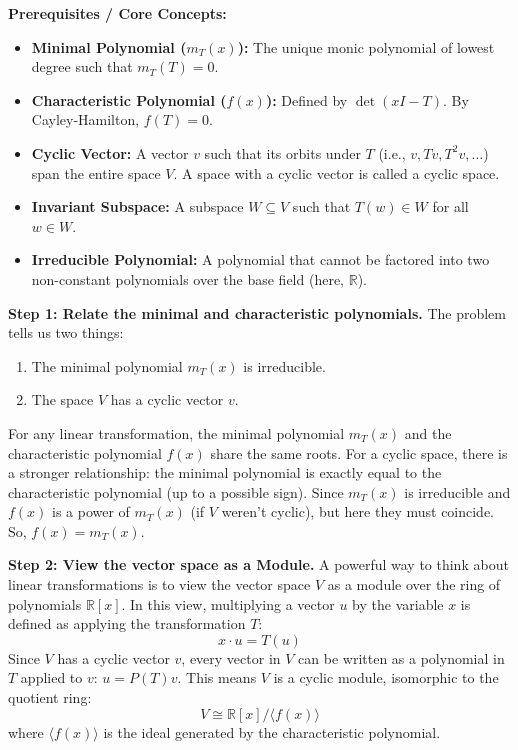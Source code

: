 \begin{solution}
\textbf{Prerequisites / Core Concepts:}
\begin{itemize}
    \item \textbf{Minimal Polynomial ($m_T(x)$):} The unique monic polynomial of lowest degree such that $m_T(T) = 0$.
    \item \textbf{Characteristic Polynomial ($f(x)$):} Defined by $\det(xI - T)$. By Cayley-Hamilton, $f(T) = 0$.
    \item \textbf{Cyclic Vector:} A vector $v$ such that its orbits under $T$ (i.e., $v, Tv, T^2v, \dots$) span the entire space $V$. A space with a cyclic vector is called a cyclic space.
    \item \textbf{Invariant Subspace:} A subspace $W \subseteq V$ such that $T(w) \in W$ for all $w \in W$.
    \item \textbf{Irreducible Polynomial:} A polynomial that cannot be factored into two non-constant polynomials over the base field (here, $\mathbb{R}$).
\end{itemize}

\textbf{Step 1: Relate the minimal and characteristic polynomials.}
The problem tells us two things:
\begin{enumerate}
    \item The minimal polynomial $m_T(x)$ is irreducible.
    \item The space $V$ has a cyclic vector $v$.
\end{enumerate}
For any linear transformation, the minimal polynomial $m_T(x)$ and the characteristic polynomial $f(x)$ share the same roots. For a cyclic space, there is a stronger relationship: the minimal polynomial is exactly equal to the characteristic polynomial (up to a possible sign). 
Since $m_T(x)$ is irreducible and $f(x)$ is a power of $m_T(x)$ (if $V$ weren't cyclic), but here they must coincide. So, $f(x) = m_T(x)$.

\textbf{Step 2: View the vector space as a Module.}
A powerful way to think about linear transformations is to view the vector space $V$ as a module over the ring of polynomials $\mathbb{R}[x]$. In this view, multiplying a vector $u$ by the variable $x$ is defined as applying the transformation $T$:
\[ x \cdot u = T(u) \]
Since $V$ has a cyclic vector $v$, every vector in $V$ can be written as a polynomial in $T$ applied to $v$: $u = P(T)v$. 
This means $V$ is a cyclic module, isomorphic to the quotient ring:
\[ V \cong \mathbb{R}[x] / \langle f(x) \rangle \]
where $\langle f(x) \rangle$ is the ideal generated by the characteristic polynomial.


\end{solution}

